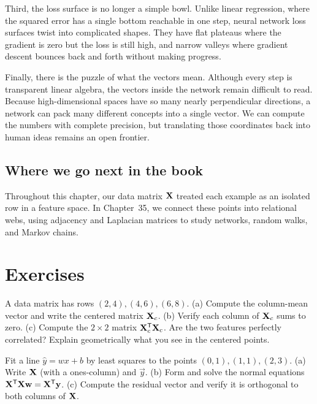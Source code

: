 Third, the loss surface is no longer a simple bowl. Unlike linear regression, where the squared error
has a single bottom reachable in one step, neural network loss surfaces twist into complicated
shapes. They have flat plateaus where the gradient is zero but the loss is still high,
and narrow valleys where gradient descent bounces back and forth without making progress.

Finally, there is the puzzle of what the vectors mean. Although every step is
transparent linear algebra, the vectors inside the network remain difficult to read.
Because high-dimensional spaces have so many nearly perpendicular directions, a network can
pack many different concepts into a single vector. We can
compute the numbers with complete precision, but translating those coordinates back into
human ideas remains an open frontier.

\subsection*{Where we go next in the book}

Throughout this chapter, our data matrix $\mathbf{X}$ treated each example as an isolated
row in a feature space. In Chapter~35, we connect these points into relational webs,
using adjacency and Laplacian matrices to study networks, random walks, and Markov chains.

\section{Exercises}
\label{ch34:exercises}

\begin{exercise}
A data matrix has rows $(2,4),(4,6),(6,8)$.
(a) Compute the column-mean vector and write the centered matrix $\mathbf{X}_c$.
(b) Verify each column of $\mathbf{X}_c$ sums to zero.
(c) Compute the $2\times2$ matrix $\mathbf{X}_c^{\mathsf{T}}\mathbf{X}_c$. Are the two features perfectly
correlated? Explain geometrically what you see in the centered points.
\end{exercise}

\begin{exercise}
Fit a line $\hat y = wx+b$ by least squares to the points $(0,1),(1,1),(2,3)$.
(a) Write $\mathbf{X}$ (with a ones-column) and $\vec{y}$.
(b) Form and solve the normal equations $\mathbf{X}^{\mathsf{T}}\mathbf{X}\mathbf{w}=\mathbf{X}^{\mathsf{T}}\mathbf{y}$.
(c) Compute the residual vector and verify it is orthogonal to both columns of $\mathbf{X}$.
\end{exercise}

